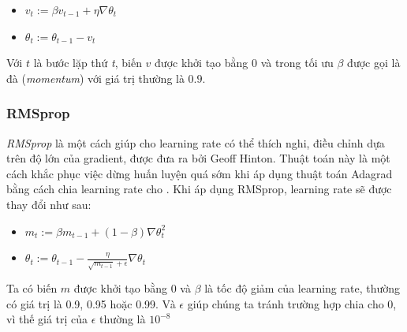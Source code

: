 \begin{itemize}
\item[] $v_t:= \beta v_{t-1} +\eta \nabla\theta_{t}$
\item[]  $ \theta_t:= \theta_{t-1} - v_t$
\end{itemize}
Với $t$ là bước lặp thứ \textit{t}, biến $v$ được khởi tạo bằng 0 và trong tối ưu $\beta$ được gọi là đà (\textit{momentum}) với giá trị thường là $0.9$.
%
%

\subsubsection{RMSprop}
\hspace{5mm} \textit{RMSprop} là một cách giúp cho learning rate có thể thích nghi, điều chỉnh dựa trên độ lớn của gradient, được đưa ra bởi Geoff Hinton. Thuật toán này là một cách khắc phục việc dừng huấn luyện quá sớm khi áp dụng thuật toán Adagrad bằng cách chia learning rate cho . Khi áp dụng RMSprop, learning rate sẽ được thay đổi như sau:
\begin{itemize}
\item[] $m_t := \beta m_{t-1} + (1-\beta) \nabla\theta_{t}^2  $
\item[] $\theta_t := \theta_{t-1} - \frac{\eta}{\sqrt{m_{t-1}}+\epsilon}\nabla\theta_{t}$
\end{itemize}
Ta có biến $m$ được khởi tạo bằng 0 và $\beta$ là tốc độ giảm của learning rate, thường có giá trị là 0.9, 0.95 hoặc 0.99. Và $\epsilon$ giúp chúng ta tránh trường hợp chia cho 0, vì thế giá trị của $\epsilon$ thường là $10^{-8}$ 
